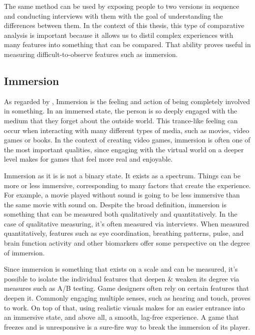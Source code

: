 The same method can be used by exposing people to two versions in sequence and conducting interviews with them with the goal of understanding the differences between them.
In the context of this thesis, this type of comparative analysis is important because it allows us to distil complex experiences with many features into something that can be compared. That ability proves useful in measuring difficult-to-observe features such as immersion. 







\subsection{Immersion}

As regarded by \textcite{cambridgedictionaryImmersion2026}, Immersion is the feeling and action of being completely involved in something. In an immersed state, the person is so deeply engaged with the medium that they forget about the outside world. This trance-like feeling can occur when interacting with many different types of media, such as movies, video games or books. 
In the context of creating video games, immersion is often one of the most important qualities, since engaging with the virtual world on a deeper level makes for games that feel more real and enjoyable. 


Immersion as it is is not a binary state. It exists as a spectrum. Things can be more or less immersive, corresponding to many factors that create the experience. For example, a movie played without sound is going to be less immersive than the same movie with sound on.
Despite the broad definition, immersion is something that can be measured both qualitatively and quantitatively. In the case of qualitative measuring, it's often measured via interviews. When measured quantitatively, features such as eye coordination, breathing patterns, pulse, and brain function activity and other biomarkers offer some perspective on the degree of immersion. 

Since immersion is something that exists on a scale and can be measured, it's possible to isolate the individual features that deepen \& weaken its degree via measures such as A/B testing. Game designers often rely on certain features that deepen it. Commonly engaging multiple senses, such as hearing and touch, proves to work. 
On top of that, using realistic visuals makes for an easier entrance into an immersive state, and above all, a smooth, lag-free experience. A game that freezes and is unresponsive is a sure-fire way to break the immersion of its player.



